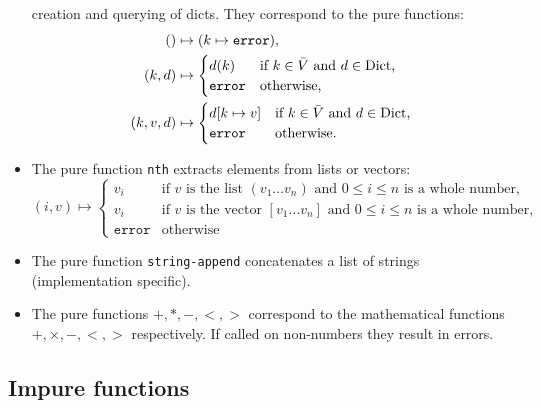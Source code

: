 \begin{itemize}
  creation and querying of dicts. They correspond to the pure functions:
  \begin{align*}
    () &\mapsto (k \mapsto \mathtt{error}),\\
    (k, d) &\mapsto
             \begin{cases}
               d(k) & \text{if $k \in \bar V$ and $d \in \mathrm{Dict}$,}\\
               \mathtt{error} & \text{otherwise,}
             \end{cases}\\
    (k, v, d) &\mapsto \begin{cases}
                       d[k \mapsto v] & \text{if $k \in \bar V$ and $d \in \mathrm{Dict}$,}\\
                       \mathtt{error} & \text{otherwise.}
                       \end{cases}
  \end{align*}
\item The pure function \texttt{nth} extracts elements from lists or vectors:
  \[
    (i, v) \mapsto
    \begin{cases}
      v_i & \text{if $v$ is the list $(v_1 \ldots v_n)$ and $0 \leq i \leq n$ is
        a whole number,}\\
      v_i & \text{if $v$ is the vector $[v_1 \ldots v_n]$ and $0 \leq i \leq n$ is
      a whole number,}\\
      \mathtt{error} & \text{otherwise}
    \end{cases}
  \]
\item The pure function \texttt{string-append} concatenates a list of strings
  (implementation specific).
\item The pure functions $\mathtt{+}, \mathtt{*}, \mathtt{-}, \mathtt{<},
  \mathtt{>}$ correspond to the mathematical functions $+, \times, -, <, >$
  respectively. If called on non-numbers they result in errors.
\end{itemize}

\subsection{Impure functions}

